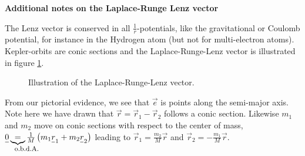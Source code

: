\textbf{Additional notes on the Laplace-Runge Lenz vector} \par
The Lenz vector is conserved in all $\frac{1}{r}$-potentials, like the gravitational or Coulomb potential, for instance
in the Hydrogen atom (but not for multi-electron atoms). Kepler-orbits are conic sections and the Laplace-Runge-Lenz vector
is illustrated in figure \ref{fig:laplace_runge_lenz}.

\begin{figure}[!htb]
  \centering
  \hfill
  \caption{Illustration of the Laplace-Runge-Lenz vector.}
  \label{fig:laplace_runge_lenz}
\end{figure}

From our pictorial evidence, we see that $\vec{e}$ is points along the semi-major axis. Note here we have drawn that $\vec{r} = \vec{r}_1 - \vec{r}_2$ follows a conic section.
Likewise $m_1$ and $m_2$ move on conic sections with respect to the center of mass, $\vec{0} \explain{=}{o.b.d.A.} \frac{1}{M} \left( m_1 \vec{r}_1 + m_2 \vec{r}_2 \right)$ leading
to $\vec{r}_1 = \frac{m_2}{M} \vec{r}$ and $\vec{r}_2 = - \frac{m_1}{M} \vec{r}$.


